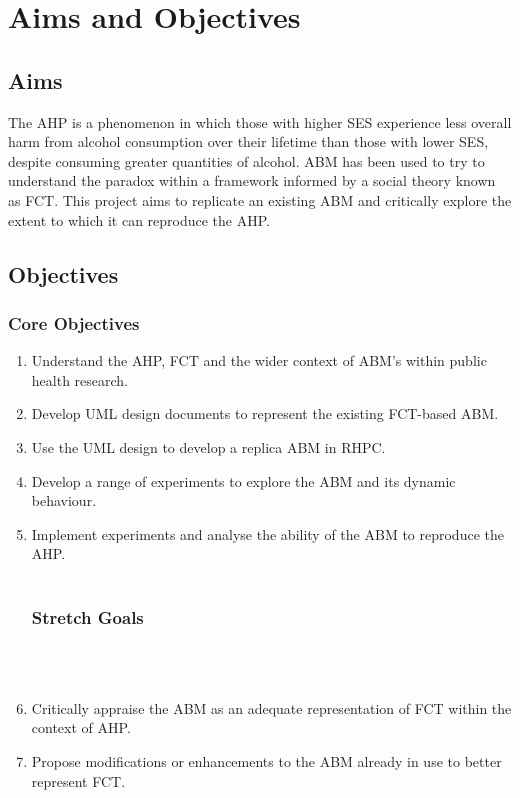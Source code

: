 \chapter{Aims and Objectives}

\section{Aims}
The \ac{AHP} is a phenomenon in which those with higher \ac{SES} experience less overall harm from alcohol consumption over their lifetime than those with lower \ac{SES}, despite consuming greater quantities of alcohol. \ac{ABM} has been used to try to understand the paradox within a framework informed by a social theory known as  \ac{FCT}. This project aims to replicate an existing \ac{ABM} and critically explore the extent to which it can reproduce the \ac{AHP}.


\section{Objectives}
\subsection{Core Objectives}
\begin{enumerate}%
    \item Understand the \ac{AHP}, \ac{FCT} and the wider context of ABM's within public health research. 
    \item Develop \ac{UML} design documents to represent the existing \ac{FCT}-based ABM. 
    \item Use the \ac{UML} design to develop a replica ABM in \ac{RHPC}. 
    \item Develop a range of experiments to explore the ABM and its dynamic behaviour. 
    \item Implement experiments and analyse the ability of the \ac{ABM} to reproduce the \ac{AHP}. 
\\
\\
\hline
\subsection{Stretch Goals}
\\
\\
    \item Critically appraise the \ac{ABM} as an adequate representation of \ac{FCT} within the context of \ac{AHP}. 
    \item Propose modifications or enhancements to the \ac{ABM} already in use to better represent \ac{FCT}. \end{enumerate} 
